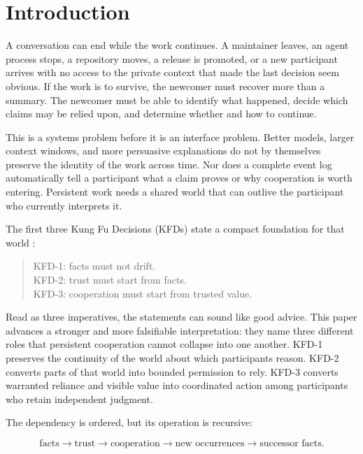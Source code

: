 \section{Introduction}

A conversation can end while the work continues. A maintainer leaves, an
agent process stops, a repository moves, a release is promoted, or a new
participant arrives with no access to the private context that made the last
decision seem obvious. If the work is to survive, the newcomer must recover
more than a summary. The newcomer must be able to identify what happened,
decide which claims may be relied upon, and determine whether and how to
continue.

This is a systems problem before it is an interface problem. Better models,
larger context windows, and more persuasive explanations do not by themselves
preserve the identity of the work across time. Nor does a complete event log
automatically tell a participant what a claim proves or why cooperation is
worth entering. Persistent work needs a shared world that can outlive the
participant who currently interprets it.

The first three Kung Fu Decisions (KFDs) state a compact foundation for that
world \cite{kfd2026alpha42}:

\begin{quote}
KFD-1: facts must not drift.\\
KFD-2: trust must start from facts.\\
KFD-3: cooperation must start from trusted value.
\end{quote}

Read as three imperatives, the statements can sound like good advice. This
paper advances a stronger and more falsifiable interpretation: they name three
different roles that persistent cooperation cannot collapse into one another.
KFD-1 preserves the continuity of the world about which participants reason.
KFD-2 converts parts of that world into bounded permission to rely. KFD-3
converts warranted reliance and visible value into coordinated action among
participants who retain independent judgment.

The dependency is ordered, but its operation is recursive:

\begin{equation}
\text{facts} \rightarrow \text{trust} \rightarrow \text{cooperation}
\rightarrow \text{new occurrences} \rightarrow \text{successor facts}.
\label{eq:intro-loop}
\end{equation}

